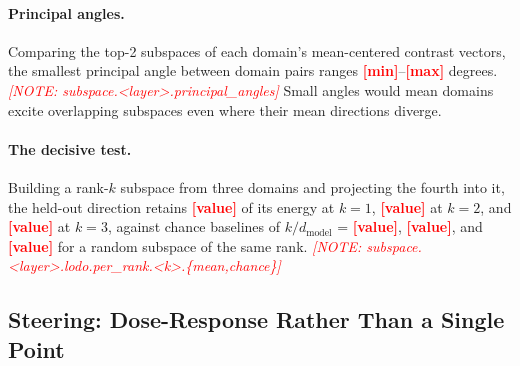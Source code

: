 \documentclass[11pt]{article}
\newcommand{\PH}[1]{\textcolor{red}{\textbf{[#1]}}}
\newcommand{\phnote}[1]{\textcolor{red}{\footnotesize\textit{[NOTE: #1]}}}
\newcommand{\dmodel}{d_{\text{model}}}
\begin{document}
\paragraph{Principal angles.}
Comparing the top-2 subspaces of each domain's mean-centered contrast vectors,
the smallest principal angle between domain pairs ranges \PH{min}--\PH{max}
degrees.
\phnote{subspace.<layer>.principal\_angles} Small angles would mean domains
excite overlapping subspaces even where their mean directions diverge.

\paragraph{The decisive test.}
Building a rank-$k$ subspace from three domains and projecting the fourth into
it, the held-out direction retains \PH{value} of its energy at $k{=}1$,
\PH{value} at $k{=}2$, and \PH{value} at $k{=}3$, against chance baselines of
$k/\dmodel$ = \PH{value}, \PH{value}, and \PH{value} for a random subspace of
the same rank.
\phnote{subspace.<layer>.lodo.per\_rank.<k>.\{mean,chance\}}

%
%

\subsection{Steering: Dose-Response Rather Than a Single Point}
\label{sec:results-steering}

%
\end{document}
